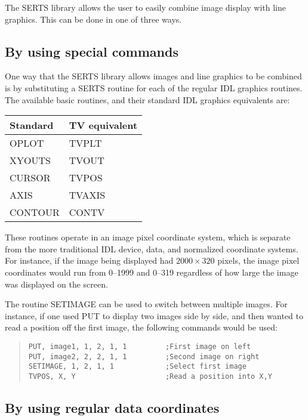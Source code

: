 The SERTS library allows the user to easily combine image display with line
graphics.  This can be done in one of three ways.

\subsection{By using special commands}
\label{equivalents}

One way that the SERTS library allows images and line graphics to be combined
is by substituting a SERTS routine for each of the regular IDL graphics
routines.  The available basic routines, and their standard IDL graphics
equivalents are:
\begin{center}
\begin{tabular}{|l|l|}
\hline
Standard	& TV equivalent\\
\hline
OPLOT		& TVPLT\\
XYOUTS		& TVOUT\\
CURSOR		& TVPOS\\
AXIS		& TVAXIS\\
CONTOUR		& CONTV\\
\hline
\end{tabular}
\end{center}

These routines operate in an image pixel coordinate system, which is separate
from the more traditional IDL device, data, and normalized coordinate systems.
For instance, if the image being displayed had \mbox{$2000 \times 320$} pixels,
the image pixel coordinates would run from 0--1999 and 0--319 regardless of how
large the image was displayed on the screen.

The routine SETIMAGE can be used to switch between multiple images.  For
instance, if one used PUT to display two images side by side, and then wanted
to read a position off the first image, the following commands would be used:
\begin{quote}
\begin{verbatim}
PUT, image1, 1, 2, 1, 1         ;First image on left
PUT, image2, 2, 2, 1, 1         ;Second image on right
SETIMAGE, 1, 2, 1, 1            ;Select first image
TVPOS, X, Y                     ;Read a position into X,Y
\end{verbatim}
\end{quote}

\subsection{By using regular data coordinates}


